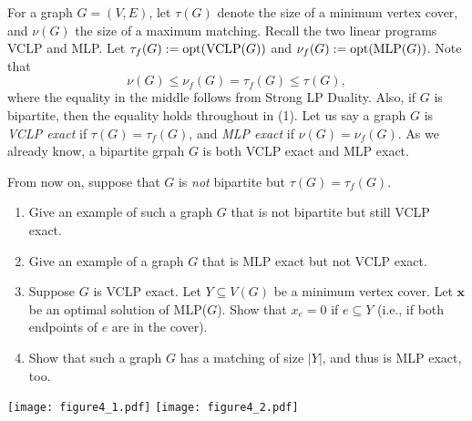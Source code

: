 



    \begin{thm}{}{}
        For a graph $G = (V, E)$, let $\tau(G)$ denote the size of a minimum vertex cover, and $\nu(G)$ the size of a maximum matching. Recall the two linear programs VCLP and MLP. Let $\tau_f(G) := {\rm opt}({\rm VCLP}(G))$ and $\nu_f(G) := {\rm opt}({\rm MLP}(G))$. Note that
        $$
        \nu(G) \leq \nu_f(G) = \tau_f(G) \leq \tau(G),
        $$
        where the equality in the middle follows from Strong LP Duality. Also, if $G$ is bipartite, then the equality holds throughout in (1). Let us say a graph $G$ is {\it VCLP exact} if $\tau(G) = \tau_f(G)$, and {\it MLP exact} if $\nu(G) = \nu_f(G)$. As we already know, a bipartite grpah $G$ is both VCLP exact and MLP exact.
        
        From now on, suppose that $G$ is {\it not} bipartite but $\tau(G) = \tau_f(G)$.
        
        \begin{enumerate}
            \item Give an example of such a graph $G$ that is not bipartite but still VCLP exact.
            \item Give an example of a graph $G$ that is MLP exact but not VCLP exact.
            \item Suppose $G$ is VCLP exact. Let $Y \subseteq V(G)$ be a minimum vertex cover. Let $\mathbf{x}$ be an optimal solution of MLP($G$). Show that $x_e = 0$ if $e \subseteq Y$ (i.e., if both endpoints of $e$ are in the cover).
            \item Show that such a graph $G$ has a matching of size $|Y|$, and thus is MLP exact, too.
        \end{enumerate}
    \end{thm}

    \begin{center}
        \texttt{[image: figure4\_1.pdf]}
        \hspace{3cm}
        \texttt{[image: figure4\_2.pdf]}
    \end{center}

